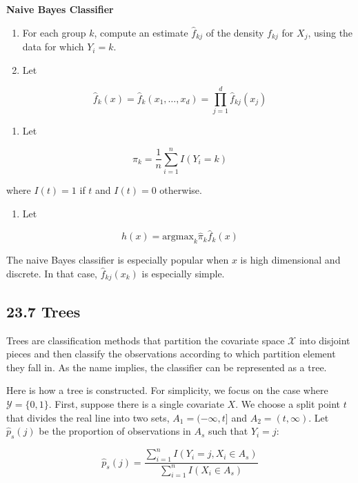 \textbf{Naive Bayes Classifier}

\begin{enumerate}
\def\labelenumi{\arabic{enumi}.}
\item
  For each group \(k\), compute an estimate \(\hat{f}_{kj}\) of the
  density \(f_{kj}\) for \(X_{j}\), using the data for which \(Y_{i} = k\).
\item
  Let
\end{enumerate}

\[ \hat{f}_{k}(x) = \hat{f}_{k}(x_{1}, \dots, x_d) = \prod_{j=1}^{d} \hat{f}_{kj}(x_{j}) \]

\begin{enumerate}[tightlist,label={\arabic*.},resume]
\item
  Let
\end{enumerate}

\[ \hat{\pi}_{k} = \frac{1}{n} \sum_{i=1}^{n} I(Y_{i} = k) \]

where \(I(t) = 1\) if \(t\) and \(I(t) = 0\) otherwise.

\begin{enumerate}[tightlist,label={\arabic*.},resume]
\item
  Let
\end{enumerate}

\[ h(x) = \text{argmax}_{k} \hat{\pi}_{k} \hat{f}_{k}(x) \]

The naive Bayes classifier is especially popular when \(x\) is high
dimensional and discrete. In that case, \(\hat{f}_{kj}(x_{k})\) is
especially simple.

\subsection*{23.7 Trees}\label{trees}

Trees are classification methods that partition the covariate space
\(\mathcal{X}\) into disjoint pieces and then classify the observations
according to which partition element they fall in. As the name implies,
the classifier can be represented as a tree.

Here is how a tree is constructed. For simplicity, we focus on the case
where \(\mathcal{Y} = \{ 0, 1 \}\). First, suppose there is a single
covariate \(X\). We choose a split point \(t\) that divides the real
line into two sets, \(A_{1} = (-\infty, t]\) and \(A_{2} = (t, \infty)\).
Let \(\hat{p}_s(j)\) be the proportion of observations in \(A_s\) such
that \(Y_{i} = j\):

\[ \hat{p}_s(j) = \frac{\sum_{i=1}^{n} I(Y_{i} = j, X_{i} \in A_s)}{\sum_{i=1}^{n} I(X_{i} \in A_s)} \]

